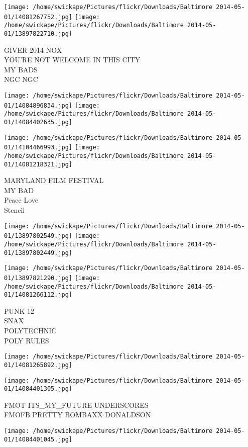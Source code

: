 \documentclass[10pt,letterpaper]{article}
\begin{document}
\texttt{[image: /home/swickape/Pictures/flickr/Downloads/Baltimore 2014-05-01/14081267752.jpg]}
\texttt{[image: /home/swickape/Pictures/flickr/Downloads/Baltimore 2014-05-01/13897822710.jpg]}

GIVER 2014 NOX\\
YOU'RE NOT WELCOME IN THIS CITY\\
MY BADS\\
NGC NGC
\pagebreak

\texttt{[image: /home/swickape/Pictures/flickr/Downloads/Baltimore 2014-05-01/14084896834.jpg]}
\texttt{[image: /home/swickape/Pictures/flickr/Downloads/Baltimore 2014-05-01/14084402635.jpg]}

\texttt{[image: /home/swickape/Pictures/flickr/Downloads/Baltimore 2014-05-01/14104466993.jpg]}
\texttt{[image: /home/swickape/Pictures/flickr/Downloads/Baltimore 2014-05-01/14081218321.jpg]}

MARYLAND FILM FESTIVAL\\
MY BAD\\
Peace Love\\
Stencil
\pagebreak

\texttt{[image: /home/swickape/Pictures/flickr/Downloads/Baltimore 2014-05-01/13897802549.jpg]}
\texttt{[image: /home/swickape/Pictures/flickr/Downloads/Baltimore 2014-05-01/13897802449.jpg]}

\texttt{[image: /home/swickape/Pictures/flickr/Downloads/Baltimore 2014-05-01/13897821290.jpg]}
\texttt{[image: /home/swickape/Pictures/flickr/Downloads/Baltimore 2014-05-01/14081266112.jpg]}

PUNK 12\\
SNAX\\
POLYTECHNIC\\
POLY RULES
\pagebreak

\texttt{[image: /home/swickape/Pictures/flickr/Downloads/Baltimore 2014-05-01/14081265892.jpg]}

\vspace{0.25in}
\texttt{[image: /home/swickape/Pictures/flickr/Downloads/Baltimore 2014-05-01/14084401305.jpg]}

FMOT ITS\_MY\_FUTURE UNDERSCORES\\
FMOFB PRETTY BOMBAXX DONALDSON
\pagebreak

\texttt{[image: /home/swickape/Pictures/flickr/Downloads/Baltimore 2014-05-01/14084401045.jpg]}
\end{document}
